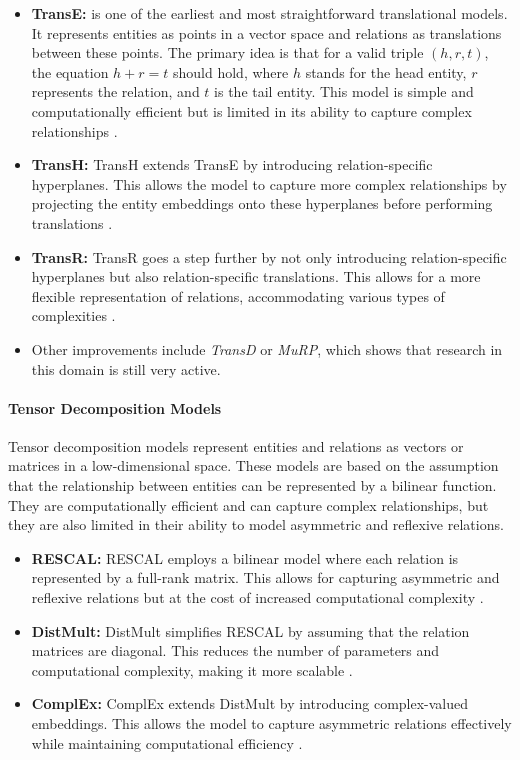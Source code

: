     \begin{itemize}
        \item \textbf{TransE:} is one of the earliest and most straightforward translational models. It represents entities as points in a vector space and relations as translations between these points. The primary idea is that for a valid triple \((h, r, t)\), the equation \(h + r = t\) should hold, where \( h \) stands for the head entity, \( r \) represents the relation, and \( t \) is the tail entity. This model is simple and computationally efficient but is limited in its ability to capture complex relationships \cite{KG21}.
        \item \textbf{TransH:} TransH extends TransE by introducing relation-specific hyperplanes. This allows the model to capture more complex relationships by projecting the entity embeddings onto these hyperplanes before performing translations \cite{KG21}.
        \item \textbf{TransR:} TransR goes a step further by not only introducing relation-specific hyperplanes but also relation-specific translations. This allows for a more flexible representation of relations, accommodating various types of complexities \cite{KG21}.
        \item Other improvements include \textit{TransD} or \textit{MuRP}, which shows that research in this domain is still very active.
    \end{itemize}

    \paragraph{Tensor Decomposition Models}
    Tensor decomposition models represent entities and relations as vectors or matrices in a low-dimensional space. These models are based on the assumption that the relationship between entities can be represented by a bilinear function. They are computationally efficient and can capture complex relationships, but they are also limited in their ability to model asymmetric and reflexive relations.

    \begin{itemize}
        \item \textbf{RESCAL:} RESCAL employs a bilinear model where each relation is represented by a full-rank matrix. This allows for capturing asymmetric and reflexive relations but at the cost of increased computational complexity \cite{KG21}.
        \item \textbf{DistMult:} DistMult simplifies RESCAL by assuming that the relation matrices are diagonal. This reduces the number of parameters and computational complexity, making it more scalable \cite{KG21} \cite{KG22}.
        \item \textbf{ComplEx:} ComplEx extends DistMult by introducing complex-valued embeddings. This allows the model to capture asymmetric relations effectively while maintaining computational efficiency \cite{KG21} \cite{KG22}.
    \end{itemize}

